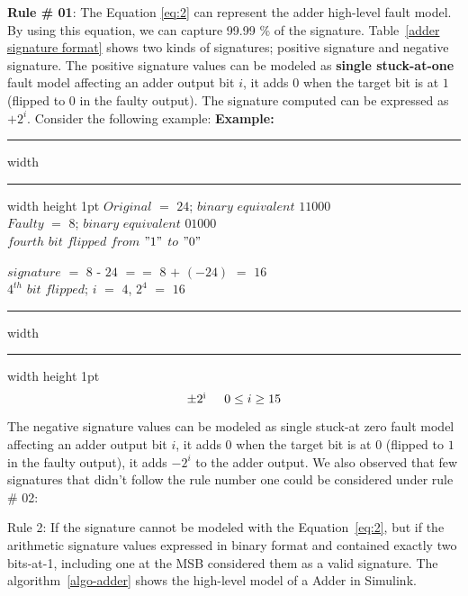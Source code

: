 \textbf{Rule \# 01}: The Equation \ref{eq:2} can represent the adder high-level fault model. By using this equation, we can capture 99.99 \% of the signature. Table~\ref{adder signature format} shows two kinds of signatures; positive signature and negative signature. 
The positive signature values can be modeled as \textbf{single stuck-at-one} fault model affecting an adder output bit $i$,  it adds $0$ when the target bit is at $1$ (flipped to $0$ in the faulty output). The signature computed can be expressed as $+2^{i}$. Consider the following example:
\vspace{ 0.1 cm}
\hspace{-0.3 cm}\textbf{Example:}
\hrule height 2pt width \hsize \kern 1pt \hrule width \hsize height 1pt
\vspace{0.2 cm}
$Original$ $=$ $24$; $binary $ $ equivalent$ $11000$ \\
\hspace{-0.15cm} $Faulty$ $=$ $8$; $binary $ $ equivalent$ $01000$ \\
$fourth$ $bit$ $flipped$ $from$ $"1"$ $to$ $"0"$

$signature$ $=$ $8$ - $24$ $==$ $8$ $+$ $(-24)$ $=$ $16$ \\
$4^{th}$ $ bit $ $flipped$; $i$  $=$ $4$, $2^{4}$ $=$ $16$
\vspace{0.01cm}
\hrule height 2pt width \hsize \kern 1pt \hrule width \hsize height 1pt
\vspace{0.25 cm}
\textit{\begin{equation}
\label{eq:2}
  \pm2\textsuperscript{i}    \hspace{0.5 cm} 0\leq i \geq15
\end{equation}}









The negative signature values can be modeled as single stuck-at zero fault model affecting an adder output bit $i$, it adds $0$ when the target bit is at $0$ (flipped to $1$ in the faulty output), it adds $-2^i$ to the adder output. 
We also observed that few signatures that didn't follow the rule number one could be considered under rule \# 02: 


Rule 2: If the signature cannot be modeled with the Equation~\ref{eq:2}, but if the arithmetic signature values expressed in binary format and contained exactly two bits-at-1, including one at the MSB considered them as a valid signature. The algorithm~\ref{algo-adder} shows the high-level model of a Adder in Simulink.

